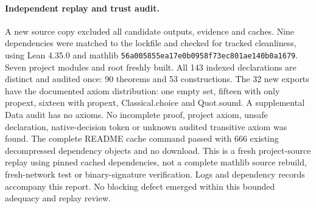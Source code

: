 \documentclass{article}
\begin{document}
\paragraph{Independent replay and trust audit.} A new source copy excluded all candidate outputs, evidence and caches. Nine dependencies were matched to the lockfile and checked for tracked cleanliness, using Lean 4.35.0 and mathlib \texttt{56a005855ea17e0b0958f73ec801ae140b0a1679}. Seven project modules and root freshly built. All 143 indexed declarations are distinct and audited once: 90 theorems and 53 constructions. The 32 new exports have the documented axiom distribution: one empty set, fifteen with only propext, sixteen with propext, Classical.choice and Quot.sound. A supplemental Data audit has no axioms. No incomplete proof, project axiom, unsafe declaration, native-decision token or unknown audited transitive axiom was found. The complete README cache command passed with 666 existing decompressed dependency objects and no download. This is a fresh project-source replay using pinned cached dependencies, not a complete mathlib source rebuild, fresh-network test or binary-signature verification. Logs and dependency records accompany this report. No blocking defect emerged within this bounded adequacy and replay review.
\end{document}
